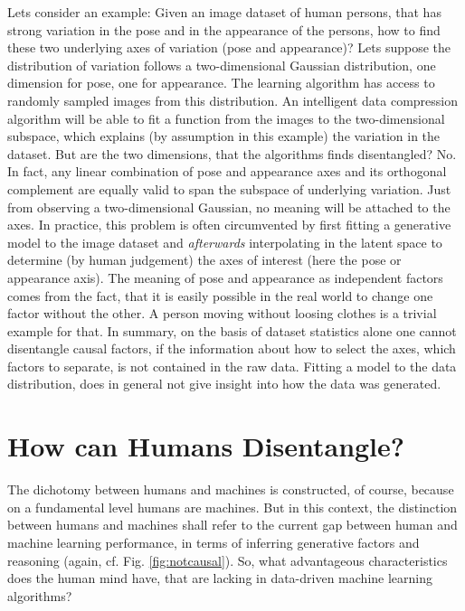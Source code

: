 	Lets consider an example: Given an image dataset of human persons, that has strong variation in the pose and in the appearance of the persons, how to find these two underlying axes of variation (pose and appearance)? Lets suppose the distribution of variation follows a two-dimensional Gaussian distribution, one dimension for pose, one for appearance.
	The learning algorithm has access to randomly sampled images from this distribution. An intelligent data compression algorithm will be able to fit a function from the images to the two-dimensional subspace, which explains (by assumption in this example) the variation in the dataset.
	But are the two dimensions, that the algorithms finds disentangled? No. In fact, any linear combination of pose and appearance axes and its orthogonal complement are equally valid to span the subspace of underlying variation. Just from observing a two-dimensional Gaussian, no meaning will be attached to the axes. In practice, this problem is often circumvented by first fitting a generative model to the image dataset and \textit{afterwards} interpolating in the latent space to determine (by human judgement) the axes of interest (here the pose or appearance axis). The meaning of pose and appearance as independent factors comes from the fact, that it is easily possible in the real world to change one factor without the other. A person moving without loosing clothes is a trivial example for that.
	In summary, on the basis of dataset statistics alone one cannot disentangle causal factors, if the information about how to select the axes, \ie which factors to separate, is not contained in the raw data.
	Fitting a model to the data distribution, does in general not give insight into how the data was generated.

\section{How can Humans Disentangle?}
	The dichotomy between humans and machines is constructed, of course, because on a fundamental level humans are machines.
	But in this context, the distinction between humans and machines shall refer to the current gap between human and machine learning performance, in terms of inferring generative factors and reasoning (again, cf. Fig. \ref{fig:notcausal}).
	So, what advantageous characteristics does the human mind have, that are lacking in data-driven machine learning algorithms?

